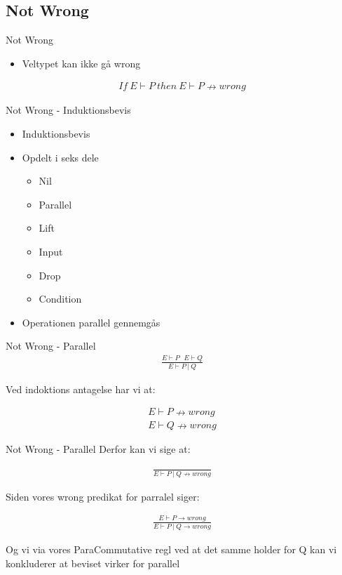 \subsection{Not Wrong}

\begin{frame}{Not Wrong}

	\begin{itemize}
		\item Veltypet kan ikke gå wrong
	\end{itemize}

	\begin{align}
		If\ E \vdash P\ then\ E \vdash P \nrightarrow wrong \tag{Not Wrong}
	\end{align}

\end{frame}

\begin{frame}{Not Wrong - Induktionsbevis}

	\begin{itemize}
		\item Induktionsbevis
		\item Opdelt i seks dele
		\begin{itemize}
			\item Nil
			\item Parallel
			\item Lift
			\item Input
			\item Drop
			\item Condition
		\end{itemize}
		\item Operationen parallel gennemgås
	\end{itemize}

\end{frame}

\begin{frame}{Not Wrong - Parallel}
	\begin{align*}
		\frac{E \vdash P\ \ \ E \vdash Q}{E \vdash P\ |\ Q}
	\end{align*}

	Ved indoktions antagelse har vi at:

	\begin{align*}
		E \vdash P \nrightarrow wrong \\
		E \vdash Q \nrightarrow wrong
	\end{align*}
\end{frame}

\begin{frame}{Not Wrong - Parallel}
	Derfor kan vi sige at:

	\begin{align*}
		\frac{}{E \vdash P\ |\ Q \nrightarrow wrong}
	\end{align*}

	Siden vores wrong predikat for parralel siger:

	\begin{align*}
		\frac{E \vdash P \rightarrow wrong}{E \vdash P\ |\ Q \rightarrow wrong}
	\end{align*}

	Og vi via vores ParaCommutative regl ved at det samme holder for Q kan vi konkluderer at beviset virker for parallel
\end{frame}

